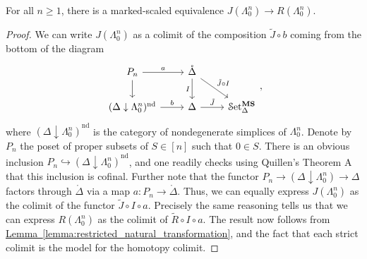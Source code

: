 \documentclass[main.tex]{subfiles}
\begin{document}
\begin{lemma}
  \label{lemma:marked_scaled_equivalence_left_horn}
  For all $n \geq 1$, there is a marked-scaled equivalence $J(\Lambda^{n}_{0}) \to R(\Lambda^{n}_{0})$.
\end{lemma}
\begin{proof}
  We can write $J(\Lambda^{n}_{0})$ as a colimit of the composition $\tilde{J} \circ b$ coming from the bottom of the diagram
  \begin{equation*}
    \begin{tikzcd}
      P_{n}
      \arrow[d]
      \arrow[r, "a"]
      & \mathring{\Delta}
      \arrow[d, swap, "I"]
      \arrow[dr, "\tilde{J} \circ I"]
      \\
      (\Delta \downarrow \Lambda^{n}_{0})^{\mathrm{nd}}
      \arrow[r, "b"]
      & \Delta
      \arrow[r, "\tilde{J}"]
      &\SSetms
    \end{tikzcd},
  \end{equation*}
  where $(\Delta \downarrow \Lambda^{n}_{0})^{\mathrm{nd}}$ is the category of nondegenerate simplices of $\Lambda^{n}_{0}$. Denote by $P_{n}$ the poset of proper subsets of $S \in [n]$ such that $0 \in S$. There is an obvious inclusion $P_{n} \hookrightarrow (\Delta \downarrow \Lambda^{n}_{0})^{\mathrm{nd}}$, and one readily checks using Quillen's Theorem A that this inclusion is cofinal. Further note that the functor $P_{n} \to (\Delta \downarrow \Lambda^{n}_{0}) \to \Delta$ factors through $\mathring{\Delta}$ via a map $a\colon P_{n} \to \mathring{\Delta}$. Thus, we can equally express $J(\Lambda^{n}_{0})$ as the colimit of the functor $\tilde{J} \circ I \circ a$. Precisely the same reasoning tells us that we can express $R(\Lambda^{n}_{0})$ as the colimit of $\tilde{R} \circ I \circ a$. The result now follows from \hyperref[lemma:restricted_natural_transformation]{Lemma~\ref*{lemma:restricted_natural_transformation}}, and the fact that each strict colimit is the model for the homotopy colimit.
\end{proof}
\end{document}
